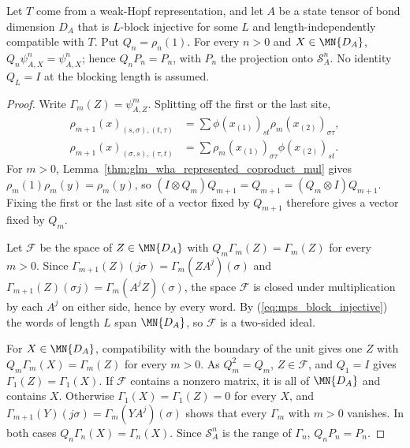 \begin{lemma}
    \label{thm:glm_wha_unit_support}
    \leanok
    Let $T$ come from a weak-Hopf representation, and let $A$ be a state
    tensor of bond dimension $D_A$ that is $L$-block injective for some $L$
    and length-independently compatible with $T$. Put $Q_n=\rho_n(1)$. For
    every $n>0$ and $X\in\MN{D_A}$, $Q_n\psi^n_{A,X}=\psi^n_{A,X}$; hence
    $Q_nP_n=P_n$, with $P_n$ the projection onto $\mathcal S_A^n$. No
    identity $Q_L=I$ at the blocking length is assumed.
\end{lemma}
\begin{proof}
    \leanok
    Write $\Gamma_m(Z)=\psi^m_{A,Z}$. Splitting off the first or the last
    site,
    \begin{align*}
        \rho_{m+1}(x)_{(s,\sigma),(t,\tau)}
         & =\sum\phi(x_{(1)})_{st}\rho_m(x_{(2)})_{\sigma\tau}, \\
        \rho_{m+1}(x)_{(\sigma,s),(\tau,t)}
         & =\sum\rho_m(x_{(1)})_{\sigma\tau}\phi(x_{(2)})_{st}.
    \end{align*}
    For $m>0$, Lemma~\ref{thm:glm_wha_represented_coproduct_mul} gives
    $\rho_m(1)\rho_m(y)=\rho_m(y)$, so
    $(I\otimes Q_m)Q_{m+1}=Q_{m+1}=(Q_m\otimes I)Q_{m+1}$. Fixing the first
    or the last site of a vector fixed by $Q_{m+1}$ therefore gives a vector
    fixed by $Q_m$.

    Let $\mathcal F$ be the space of $Z\in\MN{D_A}$ with
    $Q_m\Gamma_m(Z)=\Gamma_m(Z)$ for every $m>0$. Since
    $\Gamma_{m+1}(Z)(j\sigma)=\Gamma_m(ZA^j)(\sigma)$ and
    $\Gamma_{m+1}(Z)(\sigma j)=\Gamma_m(A^jZ)(\sigma)$, the space
    $\mathcal F$ is closed under multiplication by each $A^j$ on either side,
    hence by every word. By (\ref{eq:mps_block_injective}) the words of
    length $L$ span $\MN{D_A}$, so $\mathcal F$ is a two-sided ideal.

    For $X\in\MN{D_A}$, compatibility with the boundary of the unit gives one
    $Z$ with $Q_m\Gamma_m(X)=\Gamma_m(Z)$ for every $m>0$. As $Q_m^2=Q_m$,
    $Z\in\mathcal F$, and $Q_1=I$ gives $\Gamma_1(Z)=\Gamma_1(X)$. If
    $\mathcal F$ contains a nonzero matrix, it is all of $\MN{D_A}$ and
    contains $X$. Otherwise $\Gamma_1(X)=\Gamma_1(Z)=0$ for every $X$, and
    $\Gamma_{m+1}(Y)(j\sigma)=\Gamma_m(YA^j)(\sigma)$ shows that every
    $\Gamma_m$ with $m>0$ vanishes. In both cases
    $Q_n\Gamma_n(X)=\Gamma_n(X)$. Since $\mathcal S_A^n$ is the range of
    $\Gamma_n$, $Q_nP_n=P_n$.
\end{proof}

